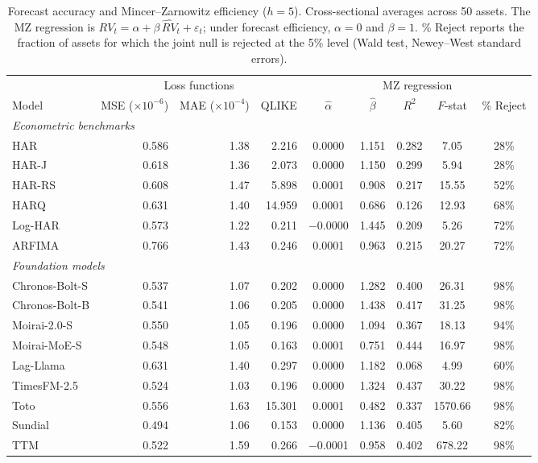 \begin{table}[H]
\centering
\singlespacing
\caption{Forecast accuracy and Mincer--Zarnowitz efficiency ($h = 5$). Cross-sectional averages across 50 assets. The MZ regression is $RV_t = \alpha + \beta \, \widehat{RV}_t + \varepsilon_t$; under forecast efficiency, $\alpha = 0$ and $\beta = 1$. \% Reject reports the fraction of assets for which the joint null is rejected at the 5\% level (Wald test, Newey--West standard errors).}
\label{tab:mz_h5}
\footnotesize\setlength{\tabcolsep}{4pt}\renewcommand{\arraystretch}{0.85}
\begin{tabular}{lrrr ccccc}
\toprule
 & \multicolumn{3}{c}{Loss functions} & \multicolumn{5}{c}{MZ regression} \\
\cmidrule(lr){2-4} \cmidrule(lr){5-9}
Model & MSE ($\times 10^{-6}$) & MAE ($\times 10^{-4}$) & QLIKE & $\hat{\alpha}$ & $\hat{\beta}$ & $R^2$ & $F$-stat & \% Reject \\
\midrule
\multicolumn{9}{l}{\textit{Econometric benchmarks}} \\
HAR          & 0.586 & 1.38 & 2.216 &    0.0000 & 1.151 & 0.282 &  7.05 & 28\% \\
HAR-J        & 0.618 & 1.36 & 2.073 &    0.0000 & 1.150 & 0.299 &  5.94 & 28\% \\
HAR-RS       & 0.608 & 1.47 & 5.898 &    0.0001 & 0.908 & 0.217 & 15.55 & 52\% \\
HARQ         & 0.631 & 1.40 & 14.959 &    0.0001 & 0.686 & 0.126 & 12.93 & 68\% \\
Log-HAR      & 0.573 & 1.22 & 0.211 & $-$0.0000 & 1.445 & 0.209 &  5.26 & 72\% \\
ARFIMA       & 0.766 & 1.43 & 0.246 &    0.0001 & 0.963 & 0.215 & 20.27 & 72\% \\
\midrule
\multicolumn{9}{l}{\textit{Foundation models}} \\
Chronos-Bolt-S & 0.537 & 1.07 & 0.202 &  0.0000 & 1.282 & 0.400 & 26.31 & 98\% \\
Chronos-Bolt-B & 0.541 & 1.06 & 0.205 &  0.0000 & 1.438 & 0.417 & 31.25 & 98\% \\
Moirai-2.0-S   & 0.550 & 1.05 & 0.196 &  0.0000 & 1.094 & 0.367 & 18.13 & 94\% \\
Moirai-MoE-S   & 0.548 & 1.05 & 0.163 &  0.0001 & 0.751 & 0.444 & 16.97 & 98\% \\
Lag-Llama    & 0.631 & 1.40 & 0.297 &    0.0000 & 1.182 & 0.068 &  4.99 & 60\% \\
TimesFM-2.5    & 0.524 & 1.03 & 0.196 &  0.0000 & 1.324 & 0.437 & 30.22 & 98\% \\
Toto           & 0.556 & 1.63 & 15.301 &  0.0001 & 0.482 & 0.337 & 1570.66 & 98\% \\
Sundial        & 0.494 & 1.06 & 0.153 &  0.0000 & 1.136 & 0.405 &  5.60 & 82\% \\
TTM            & 0.522 & 1.59 & 0.266 & $-$0.0001 & 0.958 & 0.402 & 678.22 & 98\% \\
\bottomrule
\end{tabular}
\end{table}
